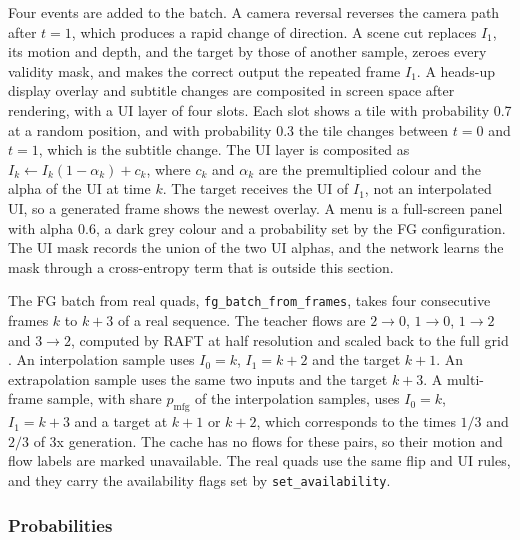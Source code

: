 Four events are added to the batch. A camera reversal reverses the camera path after $t=1$, which produces a rapid change of direction. A scene cut replaces $I_1$, its motion and depth, and the target by those of another sample, zeroes every validity mask, and makes the correct output the repeated frame $I_1$. A heads-up display overlay and subtitle changes are composited in screen space after rendering, with a UI layer of four slots. Each slot shows a tile with probability 0.7 at a random position, and with probability 0.3 the tile changes between $t=0$ and $t=1$, which is the subtitle change. The UI layer is composited as $I_k\leftarrow I_k(1-\alpha_k)+c_k$, where $c_k$ and $\alpha_k$ are the premultiplied colour and the alpha of the UI at time $k$. The target receives the UI of $I_1$, not an interpolated UI, so a generated frame shows the newest overlay. A menu is a full-screen panel with alpha $0.6$, a dark grey colour and a probability set by the FG configuration. The UI mask records the union of the two UI alphas, and the network learns the mask through a cross-entropy term that is outside this section.

The FG batch from real quads, \texttt{fg\_batch\_from\_frames}, takes four consecutive frames $k$ to $k+3$ of a real sequence. The teacher flows are $2\to0$, $1\to0$, $1\to2$ and $3\to2$, computed by RAFT at half resolution and scaled back to the full grid \cite{teed2020raft}. An interpolation sample uses $I_0=k$, $I_1=k+2$ and the target $k+1$. An extrapolation sample uses the same two inputs and the target $k+3$. A multi-frame sample, with share $p_{\mathrm{mfg}}$ of the interpolation samples, uses $I_0=k$, $I_1=k+3$ and a target at $k+1$ or $k+2$, which corresponds to the times $1/3$ and $2/3$ of 3x generation. The cache has no flows for these pairs, so their motion and flow labels are marked unavailable. The real quads use the same flip and UI rules, and they carry the availability flags set by \texttt{set\_availability}.

\subsubsection{Probabilities}\label{sec:data-synth-probs}

